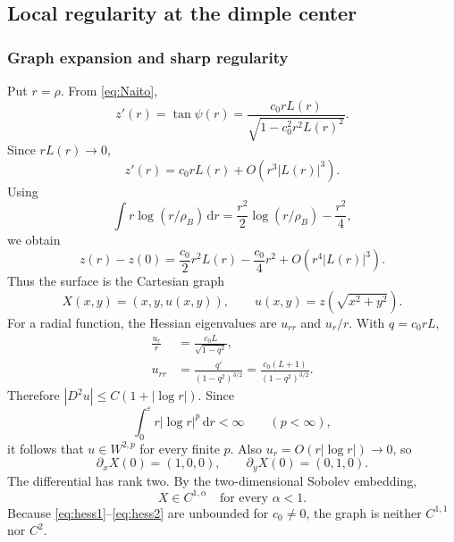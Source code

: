 \documentclass[preprint,amsmath,amssymb,aps,prl,superscriptaddress,nofootinbib,floatfix]{revtex4-2}
\newcommand{\dd}{\,\mathrm d}
\begin{document}
\subsection{Local regularity at the dimple center}\label{sec:regularity}

\subsubsection{Graph expansion and sharp regularity}
Put \(r=\rho\). From \eqref{eq:Naito},
\begin{equation}
z'(r)=\tan\psi(r)=\frac{c_0rL(r)}{\sqrt{1-c_0^2r^2L(r)^2}}.\label{eq:zprime}
\end{equation}
Since \(rL(r)\to0\),
\[
z'(r)=c_0rL(r)+O(r^3|L(r)|^3).
\]
Using
\[
\int r\log(r/\rho_B)\dd r=\frac{r^2}{2}\log(r/\rho_B)-\frac{r^2}{4},
\]
we obtain
\begin{equation}
z(r)-z(0)=\frac{c_0}{2}r^2L(r)-\frac{c_0}{4}r^2+O(r^4|L(r)|^3).\label{eq:graphasymptotic}
\end{equation}
Thus the surface is the Cartesian graph
\begin{equation}
X(x,y)=(x,y,u(x,y)),\qquad u(x,y)=z(\sqrt{x^2+y^2}).\label{eq:graph}
\end{equation}
For a radial function, the Hessian eigenvalues are \(u_{rr}\) and \(u_r/r\). With \(q=c_0rL\),
\begin{align}
\frac{u_r}{r}&=\frac{c_0L}{\sqrt{1-q^2}},\label{eq:hess1}\\
u_{rr}&=\frac{q'}{(1-q^2)^{3/2}}=\frac{c_0(L+1)}{(1-q^2)^{3/2}}.\label{eq:hess2}
\end{align}
Therefore \(|D^2u|\le C(1+|\log r|)\). Since
\begin{equation}
\int_0^\varepsilon r|\log r|^p\dd r<\infty\qquad(p<\infty),\label{eq:logintegrable}
\end{equation}
it follows that \(u\in W^{2,p}\) for every finite \(p\). Also \(u_r=O(r|\log r|)\to0\), so
\begin{equation}
\partial_xX(0)=(1,0,0),\qquad\partial_yX(0)=(0,1,0).\label{eq:rank}
\end{equation}
The differential has rank two. By the two-dimensional Sobolev embedding,
\begin{equation}
X\in C^{1,\alpha}\quad\text{for every }\alpha<1.\label{eq:C1a}
\end{equation}
Because \eqref{eq:hess1}--\eqref{eq:hess2} are unbounded for \(c_0\ne0\), the graph is neither \(C^{1,1}\) nor \(C^2\).
\end{document}
